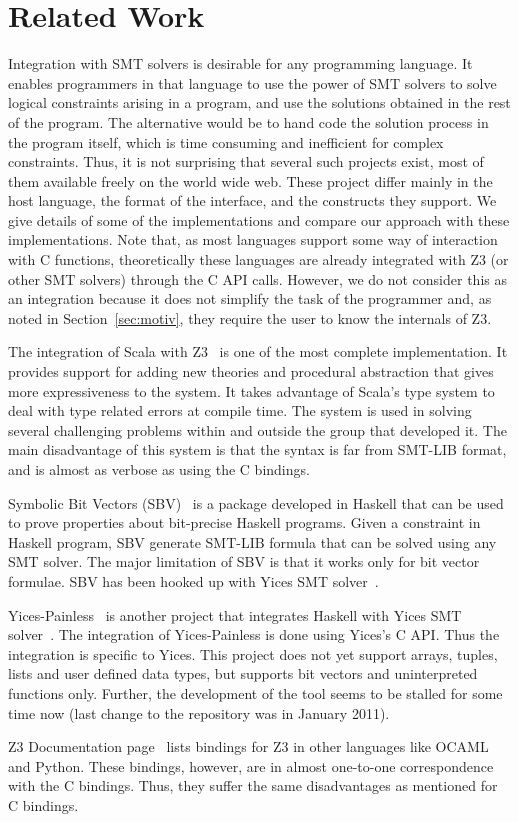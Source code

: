 \section{Related Work}
Integration with SMT solvers is desirable for any programming
language. It enables programmers in that language to use the
power of SMT solvers to solve logical constraints arising in
a program, and use the solutions obtained in the rest of the
program. The alternative would be to hand code the solution
process in the program itself, which is time consuming and
inefficient for complex constraints. Thus, it is not
surprising that several such projects exist, most of them
available freely on the world wide web. These project differ
mainly in the host language, the format of the interface, and
the constructs they support.  We give details of some of the
implementations and compare our approach with these
implementations.  Note that, as most languages support some
way of interaction with C functions, theoretically these
languages are already integrated with Z3 (or other SMT
solvers) through the C API calls. However, we do not consider
this as an integration because it does not simplify the task
of the programmer and, as noted in Section~\ref{sec:motiv},
they require the user to know the internals of Z3.


The integration of Scala with Z3~\cite{scalaz3} is one of the
most complete implementation. It provides support for adding
new theories and procedural abstraction that gives more
expressiveness to the system. It takes advantage of Scala's
type system to deal with type related errors at compile time.
The system is used in solving several challenging problems
within and outside the group that developed it. The main
disadvantage of this system is that the syntax is far from
SMT-LIB format, and is almost as verbose as using the C bindings.

Symbolic Bit Vectors (SBV)~\cite{sbv} is a package developed
in Haskell that can be used to prove properties about
bit-precise Haskell programs. Given a constraint in Haskell
program, SBV generate SMT-LIB formula that can be solved
using any SMT solver.  The major limitation of SBV is that it
works only for bit vector formulae. SBV has been hooked up
with Yices SMT solver~\cite{yices}.

Yices-Painless~\cite{yices-painless} is another project that
integrates Haskell with Yices SMT solver~\cite{yices}.  The
integration of Yices-Painless is done using Yices's C
API. Thus the integration is specific to Yices.  This project
does not yet support arrays, tuples, lists and user defined
data types, but supports bit vectors and uninterpreted
functions only. Further, the development of the tool seems to
be stalled for some time now (last change to the repository
was in January 2011).

Z3 Documentation page~\cite{z3} lists bindings for Z3
in other languages like OCAML and Python. These bindings,
however, are in almost one-to-one correspondence with the C
bindings. Thus, they suffer the same disadvantages as
mentioned for C bindings.
